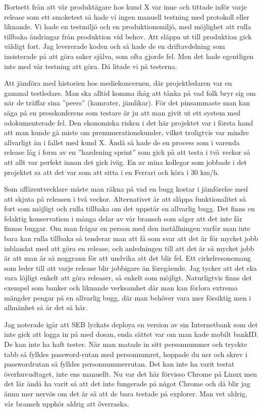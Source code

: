 \documentclass[11pt]{article}
\begin{document}
Bortsett från att vår produktägare hos kund X var inne och tittade inför varje release som ett smoketest så hade vi ingen manuell testning med protokoll eller liknande. Vi hade en testmiljö och en produktionsmiljö, med möjlighet att rulla tillbaka ändringar från produktion vid behov. Att släppa ut till produktion gick väldigt fort. Jag levererade koden och så hade de en driftavdelning som insisterade på att göra saker själva, som ofta gjorde fel. Men det hade egentligen inte med vår testning att göra. Då litade vi på testerna.

Att jämföra med historien hos mediekoncernen, där projektledaren var en gammal testledare. Man ska alltid komma ihåg att tänka på vad folk bryr sig om när de träffar sina ”peers” (kamrater, jämlikar). För det pinsammaste man kan säga på en presskonferens som testare är ju att man givit ut ett system med odokumenterade fel. Den ekonomiska risken i det här projektet var i första hand att man kunde gå miste om prenumerationskunder, vilket troligtvis var mindre allvarligt än i fallet med kund X. Ändå så hade de en process som i varenda release låg i form av en ”hardening sprint” som gick på att testa i två veckor så att allt var perfekt innan det gick iväg. En av mina kollegor som jobbade i det projektet sa att det var som att sitta i en Ferrari och köra i 30 km/h.

Som affärsutvecklare måste man räkna på vad en bugg kostar i jämförelse med att skjuta på releasen i två veckor. Alternativet är att släppa funktionalitet så fort som möjligt och rulla tillbaka om det uppstår en allvarlig bugg. Det finns en felaktig konservatism i många delar av vår bransch som säger att det inte får finnas buggar. Om man frågar en person med den inställningen varför man inte bara kan rulla tillbaka så tenderar man att få som svar att det är för mycket jobb inblandat med att göra en release, och anledningen till att det är så mycket jobb är att man är så noggrann för att undvika att det blir fel. Ett cirkelresonemang som leder till att varje release blir jobbigare än föregående. Jag tycker att det ska vara löjligt enkelt att göra releaser, så enkelt som möjligt. Naturligtvis finns det exempel som banker och liknande verksamhet där man kan förlora extrema mängder pengar på en allvarlig bugg, där man behöver vara mer försiktig men i allmänhet så är det så här.

Jag noterade igår att SEB lyckats deploya en version av sin Internetbank som det inte gick att logga in på med dosan, enda sättet var om man hade mobilt bankID. De kan inte ha haft tester. När man matade in sitt personnummer och tryckte tabb så fylldes password-rutan med personnumret, hoppade du ner och skrev i passwordrutan så fylldes personnummerrutan. Det kan inte ha varit testat överhuvudtaget, inte ens manuellt. Nu var det här förvisso Chrome på Linux men det lär ändå ha varit så att det inte fungerade på något Chrome och då blir jag ännu mer nervös om det är så att de bara testade på explorer. Man vet aldrig, vår bransch upphör aldrig att överraska.
\end{document}
